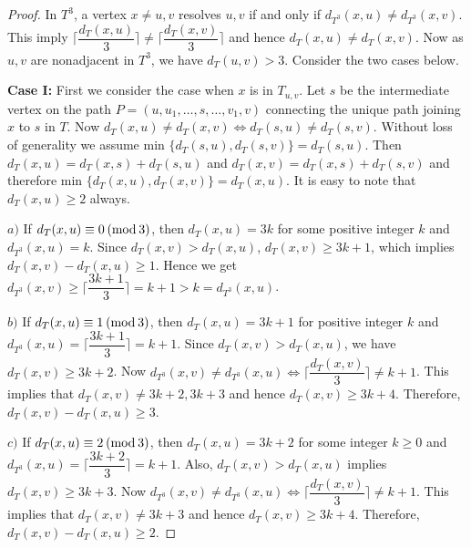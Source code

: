 \documentclass{article}
\theoremstyle{definition}
\numberwithin{equation}{section}
\begin{document}
\begin{proof}
In $T^{3}$, a vertex $x\neq u,v$ resolves $u,v$ if and only if $d_{T^{3}}(x,u)\neq d_{T^{3}}(x,v)$. This imply $\lceil \dfrac{d_{T}(x,u)}{3}\rceil\neq \lceil \dfrac{d_{T}(x,v)}{3} \rceil$ and hence $d_{T}(x,u)\neq d_{T}(x,v)$. Now as $u,v$ are nonadjacent in $T^{3}$, we have $d_{T}(u,v)>3$. Consider the two cases below. 

\vspace{0.6em}

\noindent \textbf{Case I:} First we consider the case when $x$ is in $T_{u,v}$. Let $s$ be the intermediate vertex on the path $P=(u,u_{1},\hdots,s,\hdots,v_{1},v)$ connecting the unique path joining $x$ to $s$ in $T$.
Now $d_{T}(x,u)\neq d_{T}(x,v) \Longleftrightarrow d_{T}(s,u)\neq d_{T}(s,v)$. Without loss of generality we assume  min $\{d_{T}(s,u),d_{T}(s,v)\}=d_{T}(s,u)$. Then $d_{T}(x,u)=d_{T}(x,s)+d_{T}(s,u)$ and $d_{T}(x,v)=d_{T}(x,s)+d_{T}(s,v)$ and therefore 
min $\{d_{T}(x,u),d_{T}(x,v)\}=d_{T}(x,u)$. It is easy to note that $d_{T}(x,u)\geq 2$ always.

\vspace{0.6em}
 $a)$ If $d_{T}(x,u)\equiv 0 \hspace{0.2em} (\mbox{mod} \hspace{0.2em} 3)$, then $d_{T}(x,u)=3k$ for some positive integer $k$ and $d_{T^{3}}(x,u)=k$. Since $d_{T}(x,v)>d_{T}(x,u)$, $d_{T}(x,v)\geq 3k+1$, which implies $d_{T}(x,v)-d_{T}(x,u)\geq 1$. Hence we get $d_{T^{3}}(x,v)\geq \lceil \dfrac{3k+1}{3}\rceil =k+1>k= d_{T^{3}}(x,u)$. 

\vspace{0.5em}
 $b)$ If $d_{T}(x,u)\equiv 1 \hspace{0.2em} (\mbox{mod} \hspace{0.2em} 3)$, then $d_{T}(x,u)=3k+1$ for positive integer $k$ and $d_{T^{3}}(x,u)=\lceil\dfrac{3k+1}{3}\rceil=k+1$. Since $d_{T}(x,v)>d_{T}(x,u)$, we have $d_{T}(x,v)\geq 3k+2$. Now $d_{T^{3}}(x,v)\neq d_{T^{3}}(x,u) 
\Longleftrightarrow
\lceil \dfrac{d_{T}(x,v)}{3}\rceil \neq k+1$. This implies that $d_{T}(x,v)\neq 3k+2, 3k+3$ and hence $d_{T}(x,v)\geq 3k+4$. Therefore, $d_{T}(x,v)-d_{T}(x,u)\geq 3$.

\vspace{0.7em}
 $c)$ If $d_{T}(x,u)\equiv 2 \hspace{0.2em} (\mbox{mod} \hspace{0.2em} 3)$, then
$d_{T}(x,u)=3k+2$ for some integer $k\geq 0$ and $d_{T^{3}}(x,u)=\lceil\dfrac{3k+2}{3}\rceil=k+1$. Also, $d_{T}(x,v)>d_{T}(x,u)$ implies $d_{T}(x,v)\geq 3k+3$. Now $d_{T^{3}}(x,v)\neq d_{T^{3}}(x,u)
\Longleftrightarrow
\lceil \dfrac{d_{T}(x,v)}{3}\rceil \neq k+1$. This implies that $d_{T}(x,v)\neq 3k+3$ and hence $d_{T}(x,v)\geq 3k+4$. Therefore, $d_{T}(x,v)-d_{T}(x,u)\geq 2$.



\end{proof}
\end{document}
